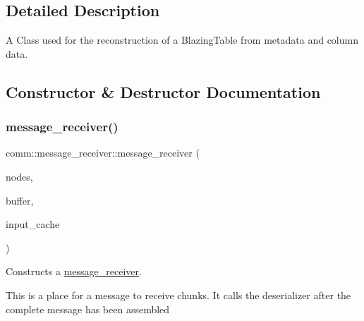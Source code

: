 \subsection{Detailed Description}
A Class used for the reconstruction of a Blazing\+Table from metadata and column data. 

\subsection{Constructor \& Destructor Documentation}
\mbox{\label{classcomm_1_1message__receiver_ab49d04074a12b8f9ad00dc26b84a43ca}} 
\subsubsection{\texorpdfstring{message\+\_\+receiver()}{message\_receiver()}}
{\footnotesize\ttfamily comm\+::message\+\_\+receiver\+::message\+\_\+receiver (\begin{DoxyParamCaption}\item[{const std\+::map$<$ std\+::string, \hyperlink{classcomm_1_1node}{comm\+::node} $>$ \&}]{nodes,  }\item[{const std\+::vector$<$ char $>$ \&}]{buffer,  }\item[{std\+::shared\+\_\+ptr$<$ \hyperlink{classral_1_1cache_1_1CacheMachine}{ral\+::cache\+::\+Cache\+Machine} $>$}]{input\+\_\+cache }\end{DoxyParamCaption})}



Constructs a \hyperlink{classcomm_1_1message__receiver}{message\+\_\+receiver}. 

This is a place for a message to receive chunks. It calls the deserializer after the complete message has been assembled


